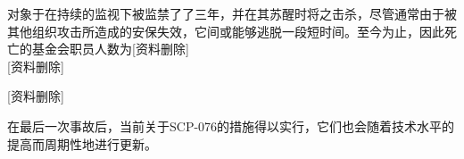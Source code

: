 对象于在持续的监视下被监禁了了三年，并在其苏醒时将之击杀，尽管通常由于被其他组织攻击所造成的安保失效，它间或能够逃脱一段短时间。至今为止，因此死亡的基金会职员人数为{[}资料删除]\\
{[}资料删除]

{[}资料删除]

在最后一次事故后，当前关于SCP-076的措施得以实行，它们也会随着技术水平的提高而周期性地进行更新。


\newpage


\newpage

